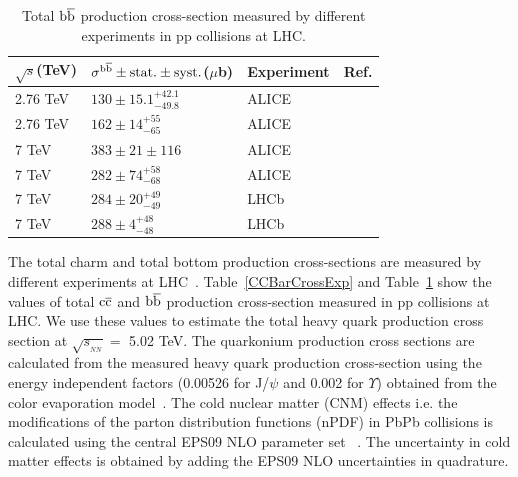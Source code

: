 \documentclass[12pt,a4paper,final]{iopart} %
\newcommand{\sNN}{\sqrt{s_{_{NN}}}}
\newcommand{\ccbar}{\rm{c\overline{c}}}
\newcommand{\bbbar}{\rm{b\overline{b}}}
\begin{document}
\begin{table}[t]
\caption[]{Total $\bbbar$ production cross-section measured by different experiments in pp collisions at LHC.}
\label{BBBarCrossExp}
\begin{tabular}{l|l|l|l} 
\hline 
\hline
  $\sqrt{s}$(TeV)           &$\sigma^{\bbbar}\pm {\rm stat.}\pm {\rm syst.}$($\mu$b)            &Experiment      &Ref.  \\              
\hline
 2.76 TeV                   &$130\pm15.1^{+42.1}_{-49.8}$           & ALICE     &\cite{Abelev:2014hla}               \\
 2.76 TeV                   &$162\pm14^{+55}_{-65}$                & ALICE     &\cite{Abelev:2012sca}               \\
 7 TeV                      &$383\pm21\pm116$                   & ALICE     &\cite{Abelev:2012sca}               \\
 7 TeV                      &$282\pm74^{+58}_{-68}$               & ALICE     &\cite{Abelev:2012gx}               \\
 7 TeV                      &$284\pm20^{+49}_{-49}$              & LHCb     &\cite{Aaij:2010gn}               \\
 7 TeV                      &$288\pm4^{+48}_{-48}$              & LHCb     &\cite{Aaij:2011jh}               \\
\hline
\hline
\end{tabular}
\end{table}




The total charm and total bottom production cross-sections are measured by different experiments at 
LHC~\cite{Abelev:2012vra,Adam:2016ich,ATLAS:2011fea,Aad:2015zix,LHCb:2010lga,Abelev:2014hla,Abelev:2012sca,Abelev:2012gx,Aaij:2010gn,Aaij:2011jh}. 
Table~\ref{CCBarCrossExp} and Table~\ref{BBBarCrossExp} show the values of total $\ccbar$ 
and $\bbbar$ production cross-section measured in pp collisions at LHC.
We use these values to estimate the 
total heavy quark production cross section at $\sNN =$ 5.02 TeV.
The quarkonium production cross sections are calculated from the measured heavy 
quark production cross-section using the energy independent factors (0.00526 for J/$\psi$ and 0.002 for $\Upsilon$)
obtained from the color evaporation model~\cite{Kumar:2014kfa,Nelson:2012bc,Vogt:2012vr}.
The cold nuclear matter (CNM) effects i.e. the modifications of the parton distribution
functions (nPDF) in PbPb collisions is calculated using the central EPS09 NLO
parameter set~\cite{Eskola:2009uj} .
The uncertainty in cold matter effects is obtained by adding the EPS09 NLO uncertainties in quadrature.
\end{document}
